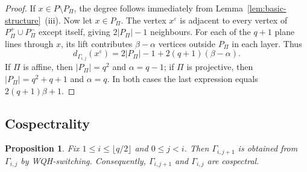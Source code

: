 \documentclass[reqno,a4paper,11pt]{article}
\newtheorem{pro}[thm]{Proposition}
\theoremstyle{definition}
\theoremstyle{remark}
\begin{document}
\begin{proof}
If $x\in P\setminus P_\Pi$, the degree follows immediately from Lemma~\ref{lem:basic-structure}~(iii).
Now let $x\in P_\Pi$.
The vertex $x^\varepsilon$ is adjacent to every vertex of $P_\Pi^+\cup P_\Pi^-$ except itself, giving $2|P_\Pi|-1$ neighbours.
For each of the $q+1$ plane lines through $x$, its lift contributes $\beta-\alpha$ vertices outside $P_\Pi$ in each layer.
Thus
\[
d_{\Gamma_{i,j}}(x^\varepsilon)=2|P_\Pi|-1+2(q+1)(\beta-\alpha).
\]
If $\Pi$ is affine, then $|P_\Pi|=q^2$ and $\alpha=q-1$; if $\Pi$ is projective, then $|P_\Pi|=q^2+q+1$ and $\alpha=q$.
In both cases the last expression equals $2(q+1)\beta+1$.
\end{proof}

\subsection{Cospectrality}

\begin{pro}\label{prop:wqh-step}
Fix $1\le i\le \lfloor q/2\rfloor$ and $0\le j<i$.
Then $\Gamma_{i,j+1}$ is obtained from $\Gamma_{i,j}$ by WQH-switching.
Consequently, $\Gamma_{i,j+1}$ and $\Gamma_{i,j}$ are cospectral.
\end{pro}
\end{document}
